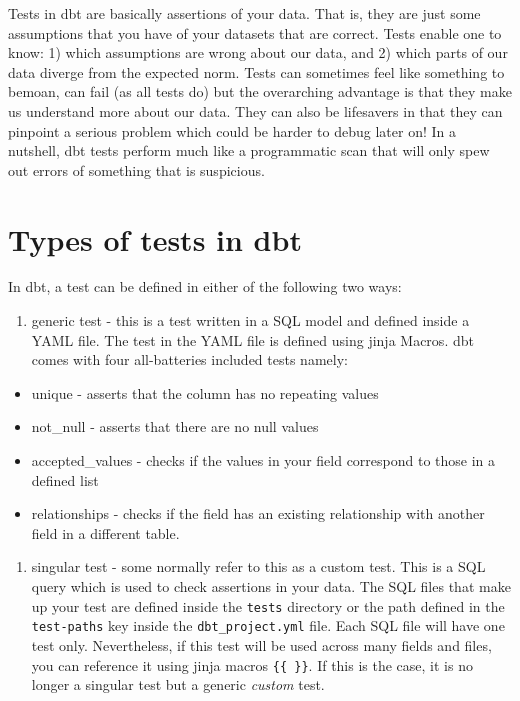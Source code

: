\documentclass[
]{book}
\providecommand{\tightlist}{%
  \setlength{\itemsep}{0pt}\setlength{\parskip}{0pt}}
\begin{document}
Tests in dbt are basically assertions of your data. That is, they are just some assumptions that you have of your datasets that are correct. Tests enable one to know: 1) which assumptions are wrong about our data, and 2) which parts of our data diverge from the expected norm. Tests can sometimes feel like something to bemoan, can fail (as all tests do) but the overarching advantage is that they make us understand more about our data. They can also be lifesavers in that they can pinpoint a serious problem which could be harder to debug later on! In a nutshell, dbt tests perform much like a programmatic scan that will only spew out errors of something that is suspicious.

\hypertarget{types-of-tests-in-dbt}{%
\section{Types of tests in dbt}\label{types-of-tests-in-dbt}}

In dbt, a test can be defined in either of the following two ways:

\begin{enumerate}
\def\labelenumi{\arabic{enumi}.}
\tightlist
\item
  generic test - this is a test written in a SQL model and defined inside a YAML file. The test in the YAML file is defined using jinja Macros. dbt comes with four all-batteries included tests namely:
\end{enumerate}

\begin{itemize}
\tightlist
\item
  unique - asserts that the column has no repeating values
\item
  not\_null - asserts that there are no null values
\item
  accepted\_values - checks if the values in your field correspond to those in a defined list
\item
  relationships - checks if the field has an existing relationship with another field in a different table.
\end{itemize}

\begin{enumerate}
\def\labelenumi{\arabic{enumi}.}
\setcounter{enumi}{1}
\tightlist
\item
  singular test - some normally refer to this as a custom test. This is a SQL query which is used to check assertions in your data. The SQL files that make up your test are defined inside the \texttt{tests} directory or the path defined in the \texttt{test-paths} key inside the \texttt{dbt\_project.yml} file. Each SQL file will have one test only. Nevertheless, if this test will be used across many fields and files, you can reference it using jinja macros \texttt{\{\{\ \}\}}. If this is the case, it is no longer a singular test but a generic \emph{custom} test.
\end{enumerate}
\end{document}
